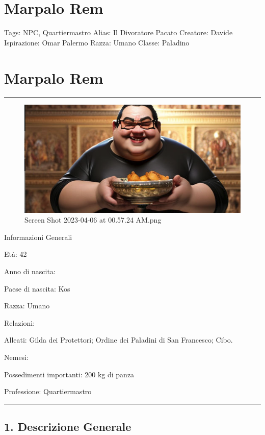 \section{Marpalo Rem}\label{marpalo-rem}

Tags: NPC, Quartiermastro Alias: Il Divoratore Pacato Creatore: Davide
Ispirazione: Omar Palermo Razza: Umano Classe: Paladino

\section{Marpalo Rem}\label{marpalo-rem-1}

\begin{center}\rule{0.5\linewidth}{0.5pt}\end{center}

\begin{figure}
\centering
\includegraphics{Screen_Shot_2023-04-06_at_00.57.24_AM.png}
\caption{Screen Shot 2023-04-06 at 00.57.24 AM.png}
\end{figure}

Informazioni Generali

Età: 42

Anno di nascita:

Paese di nascita: Kos

Razza: Umano

Relazioni:

Alleati: Gilda dei Protettori; Ordine dei Paladini di San Francesco;
Cibo.

Nemesi:

Possedimenti importanti: 200 kg di panza

Professione: Quartiermastro

\begin{center}\rule{0.5\linewidth}{0.5pt}\end{center}

\subsection{1. Descrizione Generale}\label{descrizione-generale}

